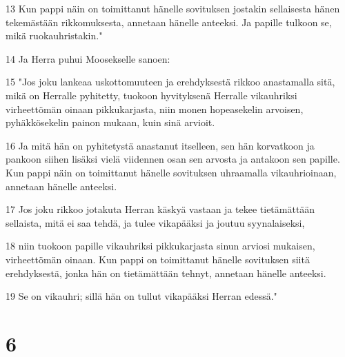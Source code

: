 \par 13 Kun pappi näin on toimittanut hänelle sovituksen jostakin sellaisesta hänen tekemästään rikkomuksesta, annetaan hänelle anteeksi. Ja papille tulkoon se, mikä ruokauhristakin."
\par 14 Ja Herra puhui Moosekselle sanoen:
\par 15 "Jos joku lankeaa uskottomuuteen ja erehdyksestä rikkoo anastamalla sitä, mikä on Herralle pyhitetty, tuokoon hyvityksenä Herralle vikauhriksi virheettömän oinaan pikkukarjasta, niin monen hopeasekelin arvoisen, pyhäkkösekelin painon mukaan, kuin sinä arvioit.
\par 16 Ja mitä hän on pyhitetystä anastanut itselleen, sen hän korvatkoon ja pankoon siihen lisäksi vielä viidennen osan sen arvosta ja antakoon sen papille. Kun pappi näin on toimittanut hänelle sovituksen uhraamalla vikauhrioinaan, annetaan hänelle anteeksi.
\par 17 Jos joku rikkoo jotakuta Herran käskyä vastaan ja tekee tietämättään sellaista, mitä ei saa tehdä, ja tulee vikapääksi ja joutuu syynalaiseksi,
\par 18 niin tuokoon papille vikauhriksi pikkukarjasta sinun arviosi mukaisen, virheettömän oinaan. Kun pappi on toimittanut hänelle sovituksen siitä erehdyksestä, jonka hän on tietämättään tehnyt, annetaan hänelle anteeksi.
\par 19 Se on vikauhri; sillä hän on tullut vikapääksi Herran edessä."

\chapter{6}

